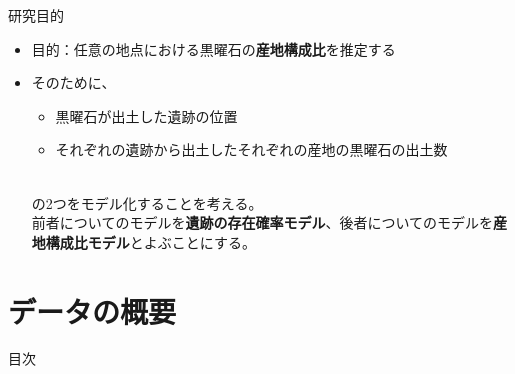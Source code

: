 \documentclass[xelatex, 8pt]{beamer}
\theoremstyle{plain}
\theoremstyle{definition}
\begin{document}
\begin{frame}{研究目的}

    \begin{itemize}
        \item 目的：任意の地点における黒曜石の\textbf{産地構成比}を推定する
        \\[2mm]
        \item そのために、
        \\[2mm]
            \begin{itemize}
                \item 黒曜石が出土した遺跡の位置
                \item それぞれの遺跡から出土したそれぞれの産地の黒曜石の出土数
            \end{itemize}
            \\[2mm]
            の2つをモデル化することを考える。
            \\[2mm]
            前者についてのモデルを\textbf{遺跡の存在確率モデル}、後者についてのモデルを\textbf{産地構成比モデル}とよぶことにする。

    \end{itemize}
\end{frame}

\section{データの概要}
\begin{frame}
{\Large 目次}
 \tableofcontents[currentsection]
\end{frame}
\end{document}

